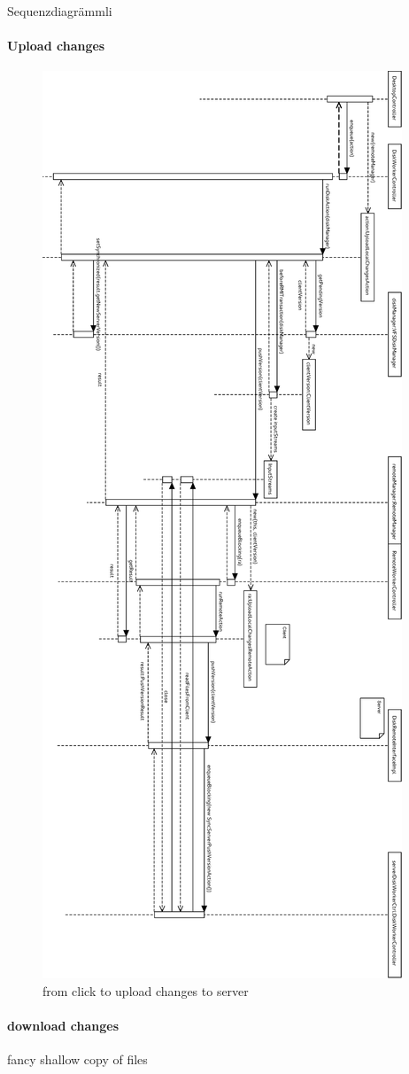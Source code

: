 Sequenzdiagrämmli
\paragraph{Upload changes}


\begin{figure}[h!]
\centering
\includegraphics[height=\textheight,width=\textwidth,keepaspectratio]{figures/22uploadChanges.eps}
\caption{from click to upload changes to server}
\label{fig:scenario_offline_mode}
\end{figure}


\paragraph{download changes}

 fancy shallow copy of files